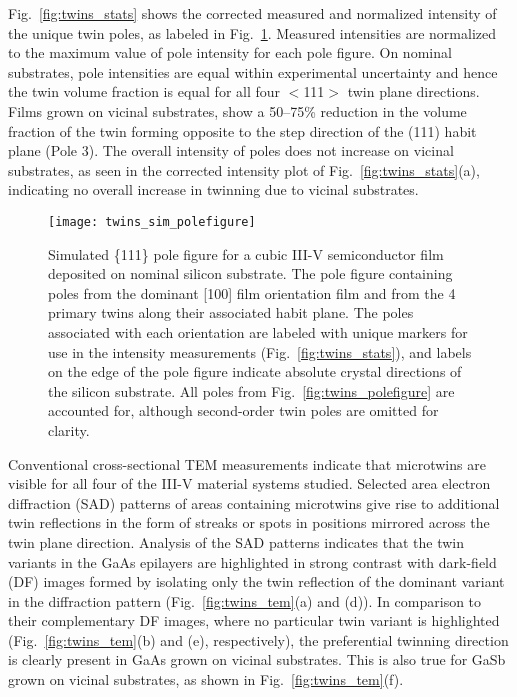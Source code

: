 Fig.~\ref{fig:twins_stats} shows the corrected measured and normalized intensity of the unique twin poles, as labeled in Fig.~\ref{fig:twins_sim_polefigure}. Measured intensities are normalized to the maximum value of pole intensity for each pole figure. On nominal substrates, pole intensities are equal within experimental uncertainty and hence the twin volume fraction is equal for all four $<$111$>$ twin plane directions. Films grown on vicinal substrates, show a 50--75\% reduction in the volume fraction of the twin forming opposite to the step direction of the (111) habit plane (Pole 3). The overall intensity of poles does not increase on vicinal substrates, as seen in the corrected intensity plot of Fig.~\ref{fig:twins_stats}(a), indicating no overall increase in twinning due to vicinal substrates.
\begin{figure}
    \centering
    \texttt{[image: twins\_sim\_polefigure]}
    \caption{\label{fig:twins_sim_polefigure}Simulated \{111\} pole figure for a cubic III-V semiconductor film deposited on nominal silicon substrate. The pole figure containing poles from the dominant [100] film orientation film and from the 4 primary twins along their associated habit plane. The poles associated with each orientation are labeled with unique markers for use in the intensity measurements (Fig.~\ref{fig:twins_stats}), and labels on the edge of the pole figure indicate absolute crystal directions of the silicon substrate. All poles from Fig.~\ref{fig:twins_polefigure} are accounted for, although second-order twin poles are omitted for clarity.}	
\end{figure}
Conventional cross-sectional TEM measurements indicate that microtwins are visible for all four of the III-V material systems studied. Selected area electron diffraction (SAD) patterns of areas containing microtwins give rise to additional twin reflections in the form of streaks or spots in positions mirrored across the twin plane direction. Analysis of the SAD patterns indicates that the twin variants in the GaAs epilayers are highlighted in strong contrast with dark-field (DF) images formed by isolating only the twin reflection of the dominant variant in the diffraction pattern (Fig.~\ref{fig:twins_tem}(a) and (d)). In comparison to their complementary DF images, where no particular twin variant is highlighted (Fig.~\ref{fig:twins_tem}(b) and (e), respectively), the preferential twinning direction is clearly present in GaAs grown on vicinal substrates. This is also true for GaSb grown on vicinal substrates, as shown in Fig.~\ref{fig:twins_tem}(f).

